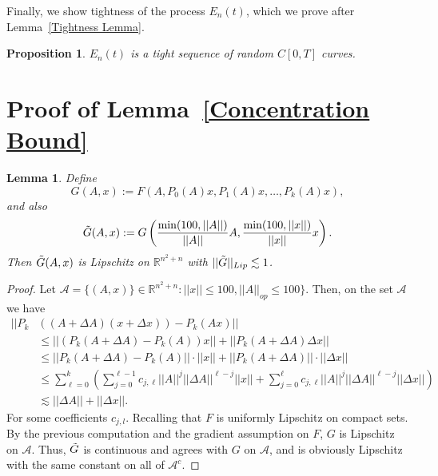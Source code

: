 \documentclass{amsart}
\newtheorem{lm}[thm]{Lemma}
\newtheorem{prop}[thm]{Proposition}
\numberwithin{equation}{section}
\newcommand{\R}{\mathbb{R}}
\begin{document}
    
Finally, we show tightness of the process $E_n(t)$, which we prove after Lemma~\ref{Tightness Lemma}.  
\begin{prop}\label{lem:tightness}
    $E_n(t)$ is a tight sequence of random $C[0,T]$ curves. 
\end{prop}




\appendix
\section{Proof of Lemma~\ref{Concentration Bound}}\label{Concentration Proof}

\begin{lm}
    Define 
    \begin{equation*}
        G(A,x):=F(A,P_0(A)x,P_1(A)x,\dots,P_k(A) x),
    \end{equation*}
    and also 
    \begin{equation*}
        \Tilde{G}(A,x) := G\left(\frac{\min(100,||A||)}{||A||}A,\frac{\min(100,||x||)}{||x||}x\right). 
    \end{equation*}
    Then $\Tilde{G}(A,x)$ is Lipschitz on $\R^{n^2+n}$ with $||\Tilde{G}||_{Lip} \lesssim 1$.
\end{lm}
\begin{proof}
Let $\mathcal{A}=\{(A,x)\}\in \R^{n^2+n}: ||x|| \leq 100, ||A||_{op} \leq 100\}$. Then, on the set $\mathcal{A}$ we have
\begin{equation*}
    \begin{split}
        ||P_k&((A+\Delta A)(x+\Delta x))-P_k(A x)|| \\
        &\leq ||(P_k(A+\Delta A)-P_k(A))x||+||P_k(A+\Delta A)\Delta x|| \\
        &\leq ||P_k(A+\Delta A)-P_k(A)|| \cdot ||x|| + ||P_k(A+\Delta A)||\cdot ||\Delta x|| \\
        &\leq \sum_{\ell=0}^{k}\left(\sum_{j=0}^{\ell-1} c_{j,\ell}||A||^j ||\Delta A||^{\ell-j} ||x||+\sum_{j=0}^{\ell} c_{j,\ell}||A||^j ||\Delta A||^{\ell-j} ||\Delta x|| \right)\\
        &\lesssim ||\Delta A|| + ||\Delta x||.
    \end{split}
\end{equation*}
For some coefficients $c_{j, l}$. Recalling that $F$ is uniformly Lipschitz on compact sets. By the previous computation and the gradient assumption on $F$, $G$ is Lipschitz on $\mathcal{A}$. Thus, $\Tilde{G}$ is continuous and agrees with $G$ on $\mathcal{A}$, and is obviously Lipschitz with the same constant on all of $\mathcal{A}^c$. 
\end{proof}
\end{document}
